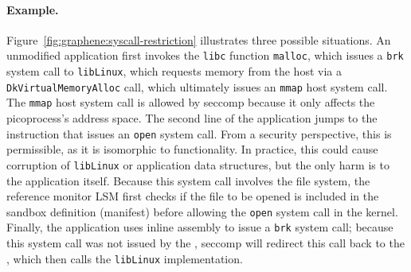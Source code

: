 \paragraph{Example.}
Figure~\ref{fig:graphene:syscall-restriction} illustrates three possible situations. 
An unmodified application first invokes the {\tt libc} function {\tt malloc}, which issues 
a {\tt brk} system call to {\tt libLinux}, which requests memory 
from the host via a {\tt Dk\-Virtual\-Memory\-Alloc} \pal{} call,
which ultimately issues an {\tt mmap} host system call.
The {\tt mmap} host system call is allowed by seccomp because it only 
affects the picoprocess's address space.
The second line of the application jumps to the \pal{} instruction that issues
an {\tt open} system call.
From a security perspective, this is permissible,
as it is isomorphic to \pal{} functionality.
In practice, this could cause
corruption of {\tt libLinux} or application data structures,
but the only harm is to the application itself. 
Because this system call involves the file system, the reference monitor LSM first checks if the file to be opened is included in the sandbox definition (manifest) before allowing  the {\tt open} system call in the kernel.  
Finally, the application uses inline assembly to issue a {\tt brk} system call;
because this system call was not issued by the \pal{},
seccomp will redirect this call back to the \pal{},
which then calls the {\tt libLinux} implementation.

